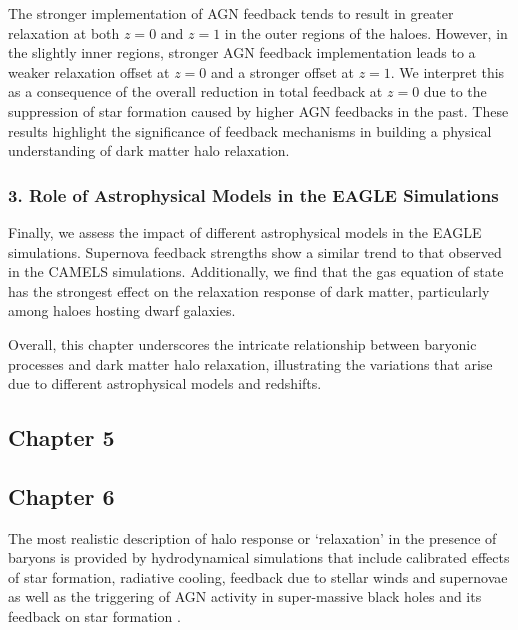 \documentclass[a4paper, 12pt, oneside]{Thesis}  %
\begin{document}
The stronger implementation of AGN feedback tends to result in greater relaxation at both \( z=0 \) and \( z=1 \) in the outer regions of the haloes. However, in the slightly inner regions, stronger AGN feedback implementation leads to a weaker relaxation offset at \( z=0 \) and a stronger offset at \( z=1 \). We interpret this as a consequence of the overall reduction in total feedback at \( z=0 \) due to the suppression of star formation caused by higher AGN feedbacks in the past. These results highlight the significance of feedback mechanisms in building a physical understanding of dark matter halo relaxation.

\subsubsection*{3. Role of Astrophysical Models in the EAGLE Simulations}
Finally, we assess the impact of different astrophysical models in the EAGLE simulations. Supernova feedback strengths show a similar trend to that observed in the CAMELS simulations. Additionally, we find that the gas equation of state has the strongest effect on the relaxation response of dark matter, particularly among haloes hosting dwarf galaxies.

Overall, this chapter underscores the intricate relationship between baryonic processes and dark matter halo relaxation, illustrating the variations that arise due to different astrophysical models and redshifts.




\subsection*{Chapter 5}



\subsection*{Chapter 6}

The most realistic description of halo response or `relaxation' in the presence of baryons is provided by hydrodynamical simulations that include calibrated effects of star formation, radiative cooling, feedback due to stellar winds and supernovae as well as the triggering of AGN activity in super-massive black holes and its feedback on star formation \cite{2015Schaye_EAGLE,2018TNG_Pillepich_etal}. 
\end{document}
